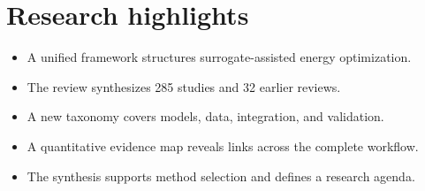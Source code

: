 \section*{Research highlights}
\begin{itemize}
    \item A unified framework structures surrogate-assisted energy optimization.
    \item The review synthesizes 285 studies and 32 earlier reviews.
    \item A new taxonomy covers models, data, integration, and validation.
    \item A quantitative evidence map reveals links across the complete workflow.
    \item The synthesis supports method selection and defines a research agenda.
\end{itemize}
